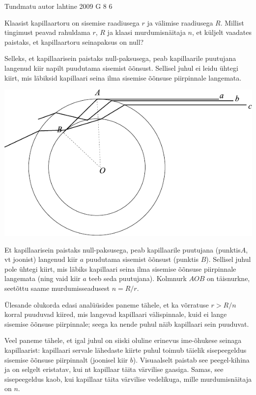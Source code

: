 {Tundmatu autor} %
{lahtine} %
{2009} %
{G 8} %
{6} %
{
\ifStatement
Klaasist kapillaartoru on sisemise raadiusega $r$ ja välimise raadiusega $R$. Millist tingimust peavad rahuldama $r$, $R$ ja klaasi murdumisnäitaja $n$, et küljelt vaadates paistaks, et kapillaartoru seinapaksus on null?
\fi


\ifHint
Selleks, et kapillaarisein paistaks null-paksusega, peab kapillaarile puutujana langenud kiir napilt puudutama sisemist õõnsust. Sellisel juhul ei leidu ühtegi kiirt, mis läbiksid kapillaari seina ilma sisemise õõnsuse piirpinnale langemata.
\fi


\ifSolution
\begin{center}
	\includegraphics[width=\linewidth]{2009-lahg-08-lah}
\end{center}

Et kapillaarisein paistaks null-paksusega, peab kapillaarile puutujana (punktis$A$, vt joonist) langenud kiir $a$ puudutama sisemist õõnsust (punktis $B$). Sellisel juhul pole ühtegi kiirt, mis läbiks kapillaari seina ilma sisemise õõnsuse piirpinnale langemata (ning vaid kiir $a$ teeb seda puutujana). Kolmnurk $AOB$ on täisnurkne, seetõttu saame murdumisseadusest $n= R/r$. 

Ülesande olukorda edasi analüüsides paneme tähele, et ka võrratuse $r> R/n$ korral puuduvad kiired, mis langevad kapillaari välispinnale, kuid ei lange sisemise õõnsuse piirpinnale; seega ka nende puhul näib kapillaari sein puuduvat. 

Veel paneme tähele, et igal juhul on siiski oluline erinevus ime-õhukese seinaga kapillaarist: kapillaari servale lähedaste kiirte puhul toimub täielik sisepeegeldus sisemise õõnsuse piirpinnalt (joonisel kiir $b$). Visuaalselt paistab see peegel-kihina ja on selgelt eristatav, kui nt kapillaar täita värvilise gaasiga. Samas, see sisepeegeldus kaob, kui kapillaar täita värvilise vedelikuga, mille murdumisnäitaja on $n$.
\fi
}